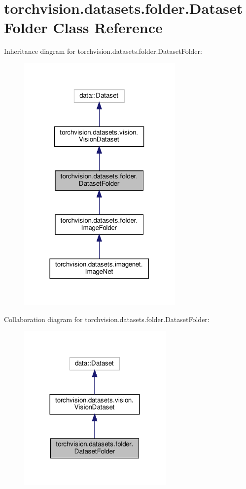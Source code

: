 \hypertarget{classtorchvision_1_1datasets_1_1folder_1_1DatasetFolder}{}\section{torchvision.\+datasets.\+folder.\+Dataset\+Folder Class Reference}
\label{classtorchvision_1_1datasets_1_1folder_1_1DatasetFolder}


Inheritance diagram for torchvision.\+datasets.\+folder.\+Dataset\+Folder\+:
\nopagebreak
\begin{figure}[H]
\begin{center}
\leavevmode
\includegraphics[width=230pt]{classtorchvision_1_1datasets_1_1folder_1_1DatasetFolder__inherit__graph}
\end{center}
\end{figure}


Collaboration diagram for torchvision.\+datasets.\+folder.\+Dataset\+Folder\+:
\nopagebreak
\begin{figure}[H]
\begin{center}
\leavevmode
\includegraphics[width=216pt]{classtorchvision_1_1datasets_1_1folder_1_1DatasetFolder__coll__graph}
\end{center}
\end{figure}
